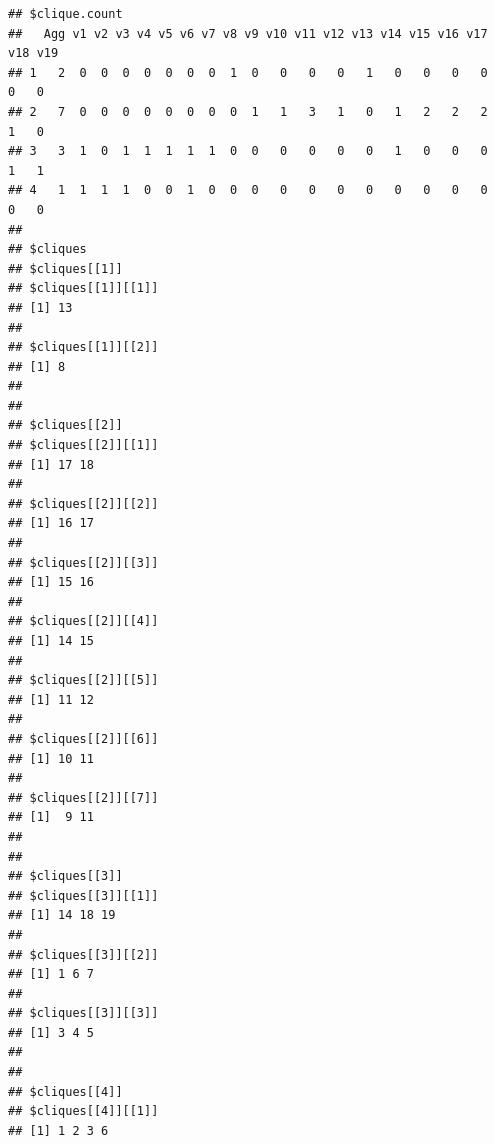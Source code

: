 \documentclass[
  notitlepage,
  onecolumn,
  openany]{book}
\begin{document}
\begin{verbatim}
## $clique.count
##   Agg v1 v2 v3 v4 v5 v6 v7 v8 v9 v10 v11 v12 v13 v14 v15 v16 v17 v18 v19
## 1   2  0  0  0  0  0  0  0  1  0   0   0   0   1   0   0   0   0   0   0
## 2   7  0  0  0  0  0  0  0  0  1   1   3   1   0   1   2   2   2   1   0
## 3   3  1  0  1  1  1  1  1  0  0   0   0   0   0   1   0   0   0   1   1
## 4   1  1  1  1  0  0  1  0  0  0   0   0   0   0   0   0   0   0   0   0
## 
## $cliques
## $cliques[[1]]
## $cliques[[1]][[1]]
## [1] 13
## 
## $cliques[[1]][[2]]
## [1] 8
## 
## 
## $cliques[[2]]
## $cliques[[2]][[1]]
## [1] 17 18
## 
## $cliques[[2]][[2]]
## [1] 16 17
## 
## $cliques[[2]][[3]]
## [1] 15 16
## 
## $cliques[[2]][[4]]
## [1] 14 15
## 
## $cliques[[2]][[5]]
## [1] 11 12
## 
## $cliques[[2]][[6]]
## [1] 10 11
## 
## $cliques[[2]][[7]]
## [1]  9 11
## 
## 
## $cliques[[3]]
## $cliques[[3]][[1]]
## [1] 14 18 19
## 
## $cliques[[3]][[2]]
## [1] 1 6 7
## 
## $cliques[[3]][[3]]
## [1] 3 4 5
## 
## 
## $cliques[[4]]
## $cliques[[4]][[1]]
## [1] 1 2 3 6
\end{verbatim}
\end{document}
